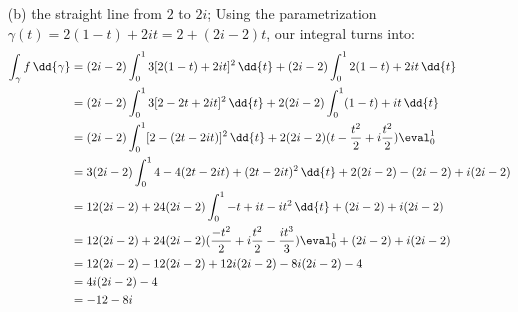 \documentclass{article}
\begin{document}
\begin{itemize}
        \item [(b)] the straight line from $2$ to $2i$;
            Using the parametrization $\gamma(t) = 2(1 - t) + 2it = 2 + (2i - 2)t$, our integral turns into:
                \begin{align*}
                    \int_{\gamma}^{} f  \, \dd{\gamma}  &= (2i - 2)\int_{0}^{1} 3[2(1 - t) + 2it]^{2} \, \dd{t} + (2i - 2) \int_{0}^{1} 2(1 - t) + 2it \, \dd{t}                  \\
                                                        &= (2i - 2)\int_{0}^{1} 3[2 - 2t + 2it]^{2} \, \dd{t} + 2(2i - 2)\int_{0}^{1} (1 - t) + it \, \dd{t}                      \\
                                                        &= (2i - 2)\int_{0}^{1} [2 - (2t - 2it)]^{2} \, \dd{t} + 2(2i - 2)(t - \dfrac{t^{2}}{2} + i\dfrac{t^{2}}{2})\eval_{0}^{1} \\
                                                        &= 3(2i - 2)\int_{0}^{1} 4 - 4(2t - 2it) + (2t - 2it)^{2} \, \dd{t} + 2(2i - 2) - (2i - 2) + i(2i - 2)                    \\
                                                        &= 12(2i - 2) + 24(2i - 2)\int_{0}^{1} -t + it - it^{2} \, \dd{t} + (2i - 2) + i(2i - 2)                                  \\
                                                        &= 12(2i - 2) + 24(2i - 2)(\dfrac{-t^{2}}{2} + i\dfrac{t^{2}}{2} - \dfrac{it^{3}}{3})\eval_{0}^{1} + (2i - 2) + i(2i - 2) \\
                                                        &= 12(2i - 2) - 12(2i - 2) + 12i(2i - 2) - 8i(2i - 2) - 4                                                                 \\
                                                        &= 4i(2i - 2) - 4                                                                                                         \\
                                                        &= -12 - 8i                                                                                                                 
                \end{align*}


\end{itemize}
\end{document}
